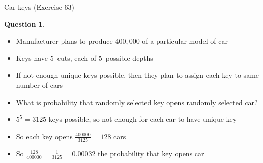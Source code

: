 \documentclass[handout]{beamer}
\theoremstyle{definition}
\newtheorem{question}{Question}
\begin{document}
\begin{frame}{Car keys (Exercise 63)}
\begin{question}
\begin{itemize}
\item Manufacturer plans to produce $400,000$ of a particular
model of car
\item Keys have $5$~cuts, each of $5$~possible depths
\item If not enough unique keys possible, then they plan to assign
each key to same number of cars
\item What is probability that randomly selected key
opens randomly selected car?
\end{itemize}
\end{question}
\begin{itemize}
\item $5^5=3125$ keys possible, so not enough for each car to have unique key
\item So each key opens $\frac{400000}{3125}=128$ cars
\item So $\frac{128}{400000}=\frac{1}{3125}=0.00032$
the probability that key opens car
\end{itemize}
\end{frame}
\end{document}

